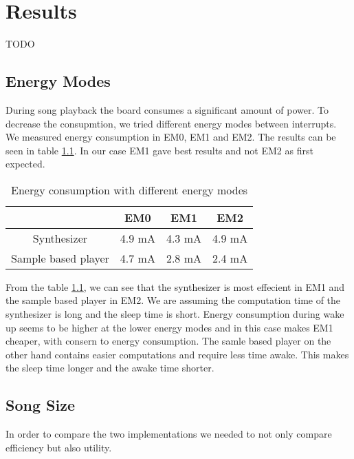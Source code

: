 \chapter{Results}
TODO

\section{Energy Modes}
\label{sec:energyModeResults}
During song playback the board consumes a significant amount of power. To decrease the consupmtion, we tried different energy modes between interrupts. We measured energy consumption in EM0, EM1 and EM2. The results can be seen in table \ref{tab:benchmarkEnergyModes}. In our case EM1 gave best results and not EM2 as first expected.

\begin{table}[H]
	\begin{center}
	\begin{tabular}{ |c|c|c|c| }
	  \hline
	  & EM0 & EM1 & EM2 \\
	  \hline
	  Synthesizer & 4.9 mA & 4.3 mA & 4.9 mA \\
	  \hline
	  Sample based player & 4.7 mA & 2.8 mA & 2.4 mA \\
	  \hline

	\end{tabular}
	\caption{Energy consumption with different energy modes}
	\label{tab:benchmarkEnergyModes}
	\end{center}
\end{table}

From the table \ref{tab:benchmarkEnergyModes}, we can see that the synthesizer is most effecient in EM1 and the sample based player in EM2. We are assuming the computation time of the synthesizer is long and the sleep time is short. Energy consumption during wake up seems to be higher at the lower energy modes and in this case makes EM1 cheaper, with consern to energy consumption. The samle based player on the other hand contains easier computations and require less time awake. This makes the sleep time longer and the awake time shorter. 

\section{Song Size}
In order to compare the two implementations we needed to not only compare efficiency but also utility. 

